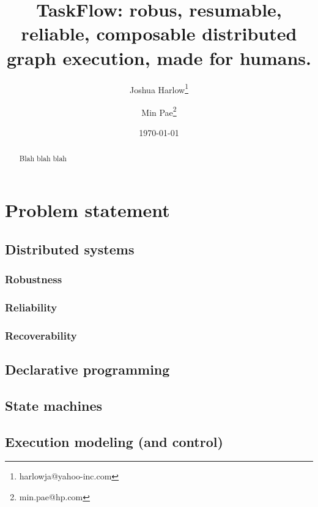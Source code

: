 \documentclass[11pt,a4paper]{article}
\begin{document}
\title{TaskFlow: robus, resumable, reliable, composable distributed graph
       execution, made for humans.}

\author[1]{Joshua Harlow\thanks{harlowja@yahoo-inc.com}}
\author[2]{Min Pae\thanks{min.pae@hp.com}}

\date{\today}

\maketitle

\begin{abstract}

Blah blah blah

\end{abstract}

\section{Problem statement}

\subsection{Distributed systems}

\subsubsection{Robustness}

\subsubsection{Reliability}

\subsubsection{Recoverability}

\subsection{Declarative programming}

\subsection{State machines}

\subsection{Execution modeling (and control)}
\end{document}
